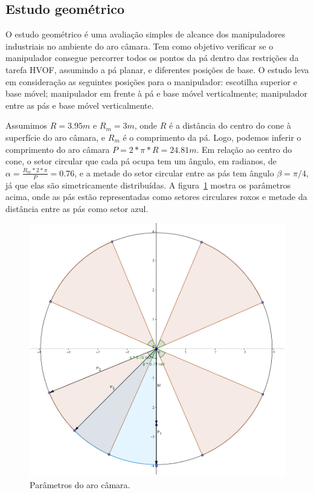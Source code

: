 \subsection{Estudo geométrico}
O estudo geométrico é uma avaliação simples de alcance dos manipuladores
industriais no ambiente do aro câmara. Tem como objetivo verificar se o
manipulador consegue percorrer todos os pontos da pá dentro das restrições da
tarefa HVOF, assumindo a pá planar, e diferentes posições de base. O estudo
leva em consideração as seguintes posições para o manipulador: escotilha
superior e base móvel; manipulador em frente à pá e base móvel verticalmente;
manipulador entre as pás e base móvel verticalmente.

Assumimos $R = 3.95 m$ e $R_m = 3 m$, onde $R$ é a distância do centro do cone à
superfície do aro câmara, e $R_m$ é o comprimento da pá. Logo, podemos
inferir o comprimento do aro câmara $P = 2*\pi *R = 24.81 m$. Em relação ao
centro do cone, o setor circular que cada pá ocupa tem um ângulo, em radianos,
de $\alpha = \frac{R_m*2*\pi}{P} = 0.76$, e a metade do setor circular entre
as pás tem ângulo $\beta = \pi/4$, já que elas são simetricamente distribuídas.
A figura~\ref{pa} mostra os parâmetros acima, onde as pás estão representadas
como setores circulares roxos e metade da distância entre as pás como setor
azul.

\begin{figure}[h!]
\centering
	\includegraphics[width=\columnwidth]{figs/estudo/geometrico/pa.png} 
	\caption{Parâmetros do aro câmara.}
	\label{pa}
\end{figure}

